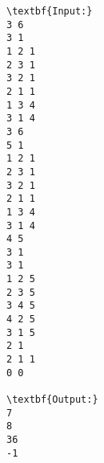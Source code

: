 \begin{verbatim}
\textbf{Input:}
3 6
3 1
1 2 1
2 3 1
3 2 1
2 1 1
1 3 4
3 1 4
3 6
5 1
1 2 1
2 3 1
3 2 1
2 1 1
1 3 4
3 1 4
4 5
3 1
3 1
1 2 5
2 3 5
3 4 5
4 2 5
3 1 5
2 1
2 1 1
0 0

\textbf{Output:}
7
8
36
-1\end{verbatim}
